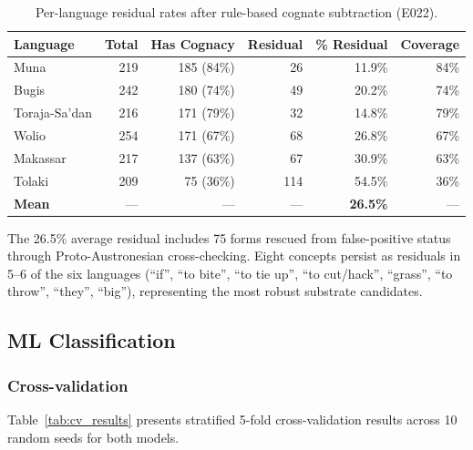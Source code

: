 \documentclass[12pt]{article}
\begin{document}
\begin{table}[H]
\centering
\caption{Per-language residual rates after rule-based cognate subtraction (E022).}
\label{tab:residuals}
\begin{tabular}{lrrrrr}
\toprule
Language & Total & Has Cognacy & Residual & \% Residual & Coverage \\
\midrule
Muna         & 219 & 185 (84\%) &  26 & 11.9\% & 84\% \\
Bugis        & 242 & 180 (74\%) &  49 & 20.2\% & 74\% \\
Toraja-Sa'dan & 216 & 171 (79\%) &  32 & 14.8\% & 79\% \\
Wolio        & 254 & 171 (67\%) &  68 & 26.8\% & 67\% \\
Makassar     & 217 & 137 (63\%) &  67 & 30.9\% & 63\% \\
Tolaki       & 209 &  75 (36\%) & 114 & 54.5\% & 36\% \\
\midrule
\textbf{Mean} & --- & --- & --- & \textbf{26.5\%} & --- \\
\bottomrule
\end{tabular}
\end{table}

The 26.5\% average residual includes 75 forms rescued from false-positive status through Proto-Austronesian cross-checking.
Eight concepts persist as residuals in 5--6 of the six languages (``if'', ``to bite'', ``to tie up'', ``to cut/hack'', ``grass'', ``to throw'', ``they'', ``big''), representing the most robust substrate candidates.

\subsection{ML Classification}
\label{sec:results_ml}

\subsubsection{Cross-validation}

Table~\ref{tab:cv_results} presents stratified 5-fold cross-validation results across 10 random seeds for both models.
\end{document}
